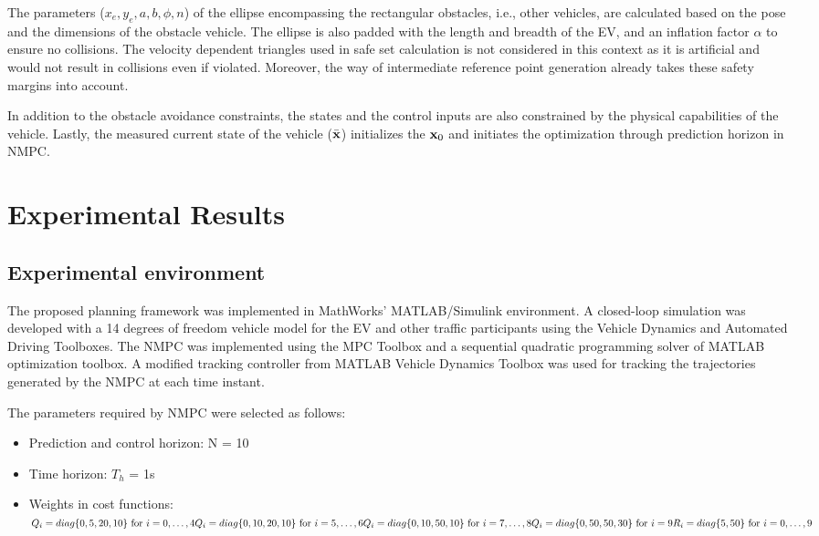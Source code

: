 \documentclass[letterpaper, 10 pt, conference]{ieeeconf}
\begin{document}
The parameters ($x_e, y_e, a, b, \phi, n$) of the ellipse encompassing the rectangular obstacles, i.e., other vehicles, are calculated based on the pose and the dimensions of the obstacle vehicle. The ellipse is also padded with the length and breadth of the EV, and an inflation factor $\alpha$ to ensure no collisions. The velocity dependent triangles used in safe set calculation is not considered in this context as it is artificial and would not result in collisions even if violated. Moreover, the way of intermediate reference point generation already takes these safety margins into account.

In addition to the obstacle avoidance constraints, the states and the control inputs are also constrained by the physical capabilities of the vehicle. Lastly, the measured current state of the vehicle ($\bar{\textbf{\text{x}}}$) initializes the $\textbf{\text{x}}_0$ and initiates the optimization through prediction horizon in NMPC.

\section{Experimental Results}

\subsection{Experimental environment}
The proposed planning framework was implemented in MathWorks' MATLAB/Simulink environment. A closed-loop simulation was developed with a 14 degrees of freedom vehicle model for the EV and other traffic participants using the Vehicle Dynamics and Automated Driving Toolboxes. The NMPC was implemented using the MPC Toolbox and a sequential quadratic programming solver \cite{blaszczykObjectLibraryAlgorithms2007} of MATLAB optimization toolbox. A modified tracking controller from MATLAB Vehicle Dynamics Toolbox was used for tracking the trajectories generated by the NMPC at each time instant.\

The parameters required by NMPC were selected as follows:
\begin{itemize}
    \item Prediction and control horizon: N = 10
    \item Time horizon: $T_h$ = 1s
    \item Weights in cost functions: \\
    $Q_{i} = diag\{0, 5, 20, 10\}\text{ for } i=0,\dots, 4  \\
    Q_{i} = diag\{0, 10, 20, 10\}\text{ for } i=5,\dots, 6 \\
    Q_{i} = diag\{0, 10, 50, 10\}\text{ for } i=7,\dots, 8 \\
    Q_{i} = diag\{0, 50, 50, 30\}\text{ for } i=9 \\
    R_{i} = diag\{5, 50\}\text{ for } i=0,\dots, 9$
\end{itemize}
\end{document}
